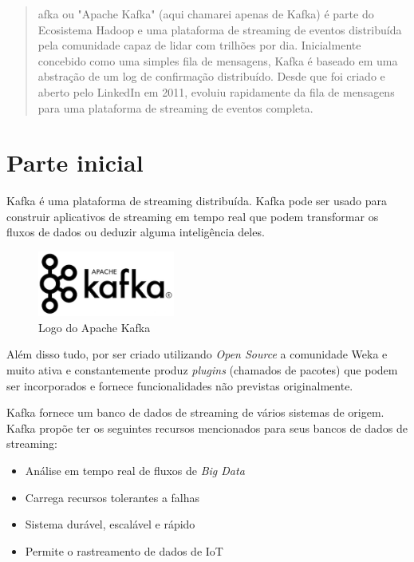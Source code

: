 \documentclass[a4paper,11pt]{article}
\begin{document}
	
	\maketitle %
	\thispagestyle{fancy} %
	
\begin{abstract}
	afka ou "Apache Kafka" (aqui chamarei apenas de Kafka) é parte do Ecosistema Hadoop e uma plataforma de streaming de eventos distribuída pela comunidade capaz de lidar com trilhões por dia. Inicialmente concebido como uma simples fila de mensagens, Kafka é baseado em uma abstração de um log de confirmação distribuído. Desde que foi criado e aberto pelo LinkedIn em 2011, evoluiu rapidamente da fila de mensagens para uma plataforma de streaming de eventos completa.
\end{abstract}

\section{Parte inicial}
Kafka é uma plataforma de streaming distribuída. Kafka pode ser usado para construir aplicativos de streaming em tempo real que podem transformar os fluxos de dados ou deduzir alguma inteligência deles. 

\begin{figure}[H]
	\centering
	\includegraphics[width=0.4\textwidth]{imagem/logo}
	\caption{Logo do Apache Kafka}
\end{figure}

Além disso tudo, por ser criado utilizando \textit{Open Source} a comunidade Weka e muito ativa e constantemente produz \textit{plugins} (chamados de pacotes) que podem ser incorporados e fornece funcionalidades não previstas originalmente.

Kafka fornece um banco de dados de streaming de vários sistemas de origem. Kafka propõe ter os seguintes recursos mencionados para seus bancos de dados de streaming: \vspace{-1em}
\begin{itemize}
	\item Análise em tempo real de fluxos de \textit{Big Data}
	\item Carrega recursos tolerantes a falhas
	\item Sistema durável, escalável e rápido
	\item Permite o rastreamento de dados de IoT 
\end{itemize}
\end{document}
